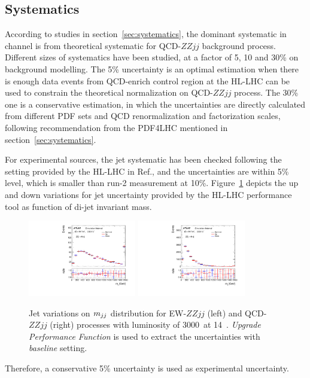 \subsection{Systematics}

According to studies in section~\ref{sec:systematics}, the dominant systematic in \llll channel is from theoretical systematic for QCD-$ZZjj$ background process.
Different sizes of systematics have been studied, at a factor of 5, 10 and 30\% on background modelling.
The 5\% uncertainty is an optimal estimation when there is enough data events from QCD-enrich control region at the HL-LHC can be used to constrain the theoretical normalization on QCD-$ZZjj$ process.
The 30\% one is a conservative estimation, in which the uncertainties are directly calculated from different PDF sets and QCD renormalization and factorization scales, following recommendation from the PDF4LHC mentioned in section~\ref{sec:systematics}.

For experimental sources, the jet systematic has been checked following the setting provided by the HL-LHC in Ref.\cite{ATL-PHYS-PUB-2016-026},
and the uncertainties are within 5\% level, which is smaller than run-2 measurement at 10\%.
Figure~\ref{fig:jet_uncer} depicts the up and down variations for jet uncertainty provided by the HL-LHC performance tool as function of di-jet invariant mass.
\begin{figure}
  \centering
  \includegraphics[width=0.42\textwidth]{figures/VBSZZ/hllhc/Uncer_baseline_TagJJM_ewk_linear.pdf}
  \includegraphics[width=0.42\textwidth]{figures/VBSZZ/hllhc/Uncer_baseline_TagJJM_qcd_linear.pdf}
  \caption{Jet variations on $m_{jj}$ distribution for EW-$ZZjj$ (left) and QCD-$ZZjj$ (right) processes
           with luminosity of 3000~\ifb at 14~\tev.
	   \textit{Upgrade Performance Function} is used to extract the uncertainties with \textit{baseline} setting.}
  \label{fig:jet_uncer}
\end{figure}
Therefore, a conservative 5\% uncertainty is used as experimental uncertainty.

